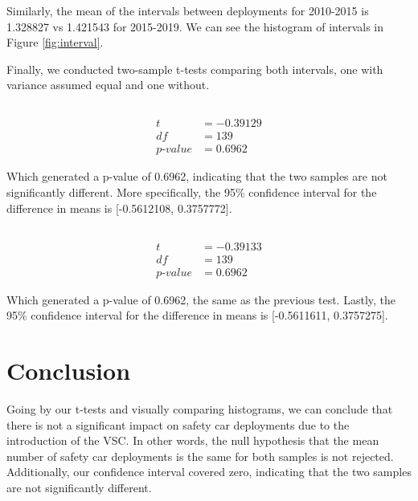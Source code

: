 \documentclass[11pt]{article}
\begin{document}
Similarly, the mean of the intervals between deployments for 2010-2015 is 1.328827 vs 1.421543 for 2015-2019.
We can see the histogram of intervals in Figure \ref{fig:interval}.

\pagebreak

Finally, we conducted two-sample t-tests comparing both intervals, one with variance assumed equal and one without.

\subsection*{}
\begin{align*}
    t              & = -0.39129 \\
    df             & = 139      \\
    p\text{-}value & = 0.6962
\end{align*}

Which generated a p-value of 0.6962, indicating that the two samples are not significantly different.
More specifically, the 95\% confidence interval for the difference in means is [-0.5612108, 0.3757772].

\subsection*{}
\begin{align*}
    t              & = -0.39133 \\
    df             & = 139      \\
    p\text{-}value & = 0.6962
\end{align*}

Which generated a p-value of 0.6962, the same as the previous test.
Lastly, the 95\% confidence interval for the difference in means is [-0.5611611, 0.3757275].

\section*{Conclusion}
Going by our t-tests and visually comparing histograms, we can conclude that there is not a significant impact on safety car deployments due to the introduction of the VSC.
In other words, the null hypothesis that the mean number of safety car deployments is the same for both samples is not rejected. Additionally, our confidence interval covered zero, indicating that the two samples are not significantly different.
\end{document}
